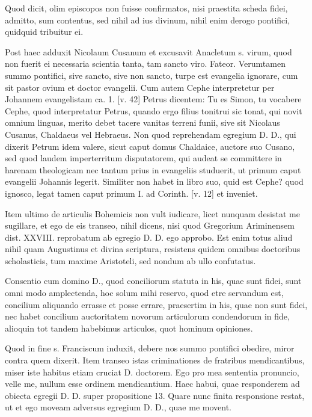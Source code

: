 Quod dicit, olim episcopos non fuisse confirmatos, nisi praestita scheda fidei, admitto, sum contentus, sed nihil ad ius divinum, nihil enim derogo pontifici, quidquid tribuitur ei.

Post haec adduxit Nicolaum Cusanum et excusavit Anacletum s. virum, quod non fuerit ei necessaria scientia tanta, tam sancto viro. Fateor. Verumtamen summo pontifici, sive sancto, sive non sancto, turpe est evangelia ignorare, cum sit pastor ovium et doctor evangelii. Cum autem Cephe interpretetur per Johannem evangelistam ca. 1. [v. 42] Petrus dicentem: Tu es Simon, tu \marginpar{\small[303]} vocabere Cephe, quod interpretatur Petrus, quando ergo filius tonitrui sic tonat, qui novit omnium linguas, merito debet tacere vanitas terreni funii, sive sit Nicolaus Cusanus, Chaldaeus vel Hebraeus. Non quod reprehendam egregium D. D., qui dixerit Petrum idem valere, sicut caput domus Chaldaice, auctore suo Cusano, sed quod laudem imperterritum disputatorem, qui audeat se committere in harenam theologicam nec tantum prius in evangeliis studuerit, ut primum caput evangelii Johannis legerit. Similiter non habet in libro suo, quid est Cephe? quod ignosco, legat tamen caput primum I. ad Corinth. [v. 12] et inveniet.

Item ultimo de articulis Bohemicis non vult iudicare, licet nunquam desistat me sugillare, et ego de eis transeo, nihil dicens, nisi quod Gregorium Ariminensem dist. XXVIII. reprobatum ab egregio D. D. ego approbo. Est enim totus aliud nihil quam Augustinus et divina scriptura, resistens quidem omnibus doctoribus scholasticis, tum maxime Aristoteli, sed nondum ab ullo confutatus.

Consentio cum domino D., quod conciliorum statuta in his, quae sunt fidei, sunt omni modo amplectenda, hoc solum mihi reservo, quod etre servandum est, concilium aliquando errasse et posse errare, praesertim in his, quae non sunt fidei, nec habet concilium auctoritatem novorum articulorum condendorum in fide, alioquin tot tandem habebimus articulos, quot hominum opiniones.

Quod in fine s. Franciscum induxit, debere nos summo pontifici obedire, miror contra quem dixerit. Item transeo istas criminationes de fratribus mendicantibus, miser iste habitus etiam cruciat D. doctorem. Ego pro mea sententia pronuncio, velle me, nullum esse ordinem mendicantium. Haec habui, quae responderem ad obiecta egregii D. D. super propositione 13. Quare nunc finita responsione restat, ut et ego moveam adversus egregium D. D., quae me movent.

